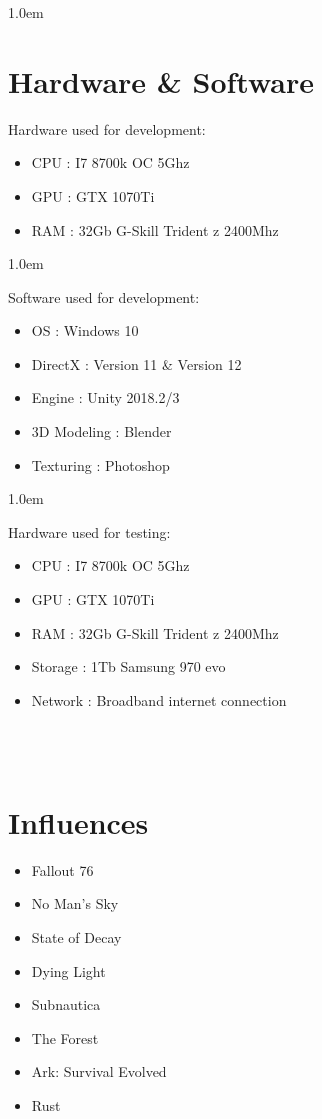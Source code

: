 \documentclass[a4paper]{report}
\newcounter{oldtocdepth}
\newcommand{\hidefromtoc}{%
  \setcounter{oldtocdepth}{\value{tocdepth}}%
  \addtocontents{toc}{\protect\setcounter{tocdepth}{-10}}%
}
\newcommand{\unhidefromtoc}{%
  \addtocontents{toc}{\protect\setcounter{tocdepth}{\value{oldtocdepth}}}%
  
  \renewcommand{\cftchapleader}{\cftdotfill{\cftdotsep}}
}
\begin{document}
\kern 1.0em

\hidefromtoc
\section *{Hardware \& Software}
\unhidefromtoc


Hardware used for development:
\begin{itemize}
	\item CPU		: I7 8700k OC 5Ghz
	\item GPU		: GTX 1070Ti
	\item RAM		: 32Gb G-Skill Trident z 2400Mhz
\end{itemize}

\kern 1.0em

Software used for development:
\begin{itemize}
	\item OS		: Windows 10
	\item DirectX		: Version 11 \& Version 12
	\item Engine		: Unity 2018.2/3
	\item 3D Modeling 	: Blender
	\item Texturing	: Photoshop
\end{itemize}

\kern 1.0em

Hardware used for testing:
\begin{itemize}
	\item CPU		: I7 8700k OC 5Ghz
	\item GPU		: GTX 1070Ti
	\item RAM		: 32Gb G-Skill Trident z 2400Mhz
	\item Storage	: 1Tb Samsung 970 evo
	\item Network	: Broadband internet connection
\end{itemize}

\clearpage \ \\ \\

\hidefromtoc
\section *{Influences}
\unhidefromtoc


\begin{itemize}
	\item Fallout 76
	\item No Man's Sky
	\item State of Decay
	\item Dying Light
	\item Subnautica
	\item The Forest
	\item Ark: Survival Evolved
	\item Rust
\end{itemize}
\end{document}

